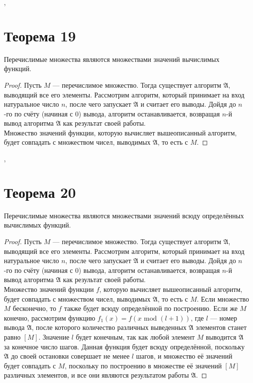 \documentclass[a4paper,12pt]{article}
\begin{document}
    \sep
    
    \section {Теорема 19}
    \begin{theorem}
    Перечислимые множества являются множествами значений вычислимых функций.
    \end{theorem}
    \begin{proof} Пусть $M$ --- перечислимое множество. Тогда существует алгоритм $\mathfrak{A}$, выводящий все его элементы. Рассмотрим алгоритм, который принимает на вход натуральное число $n$, после чего запускает $\mathfrak{A}$ и считает его выводы. Дойдя до $n$-го по счёту (начиная с 0) вывода, алгоритм останавливается, возвращая $n$-й вывод алгоритма $\mathfrak{A}$ как результат своей работы.\\
    Множество значений функции, которую вычисляет вышеописанный алгоритм, будет совпадать с множеством чисел, выводимых $\mathfrak{A}$, то есть с $M$.
    
    \end{proof}
    
    \sep
    
    \section {Теорема 20}
    \begin{theorem}
    Перечислимые множества являются множествами значений всюду определённых вычислимых функций.
    \end{theorem}
    \begin{proof} Пусть $M$ --- перечислимое множество. Тогда существует алгоритм $\mathfrak{A}$, выводящий все его элементы. Рассмотрим алгоритм, который принимает на вход натуральное число $n$, после чего запускает $\mathfrak{A}$ и считает его выводы. Дойдя до $n$-го по счёту (начиная с 0) вывода, алгоритм останавливается, возвращая $n$-й вывод алгоритма $\mathfrak{A}$ как результат своей работы.\\
    Множество значений функции $f$, которую вычисляет вышеописанный алгоритм, будет совпадать с множеством чисел, выводимых $\mathfrak{A}$, то есть с $M$. Если множество $M$ бесконечно, то $f$ также будет всюду определённой по построению. Если же $M$ конечно, рассмотрим функцию $f_1(x)=f(x \text{ mod } (l + 1))$, где $l$ --- номер вывода $\mathfrak{A}$, после которого количество различных выведенных $\mathfrak{A}$ элементов станет равно $[M]$. Значение $l$ будет конечным, так как любой элемент $M$ выводится $\mathfrak{A}$ за конечное число шагов. Данная функция будет всюду определённой, поскольку $\mathfrak{A}$ до своей остановки совершает не менее $l$ шагов, и множество её значений будет совпадать с $M$, поскольку по построению в множестве её значений $[M]$ различных элементов, и все они являются результатом работы $\mathfrak{A}$.
    
    \end{proof}
    
\end{document}
